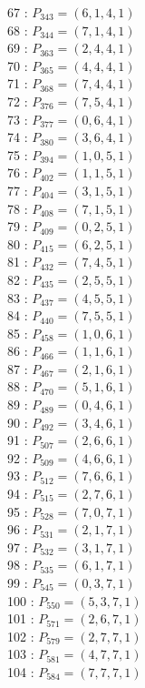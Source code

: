 \documentclass{article}
\begin{document}
{\begin{multicols}{3}
67 : $P_{343}=( 6, 1, 4, 1 )$\\
68 : $P_{344}=( 7, 1, 4, 1 )$\\
69 : $P_{363}=( 2, 4, 4, 1 )$\\
70 : $P_{365}=( 4, 4, 4, 1 )$\\
71 : $P_{368}=( 7, 4, 4, 1 )$\\
72 : $P_{376}=( 7, 5, 4, 1 )$\\
73 : $P_{377}=( 0, 6, 4, 1 )$\\
74 : $P_{380}=( 3, 6, 4, 1 )$\\
75 : $P_{394}=( 1, 0, 5, 1 )$\\
76 : $P_{402}=( 1, 1, 5, 1 )$\\
77 : $P_{404}=( 3, 1, 5, 1 )$\\
78 : $P_{408}=( 7, 1, 5, 1 )$\\
79 : $P_{409}=( 0, 2, 5, 1 )$\\
80 : $P_{415}=( 6, 2, 5, 1 )$\\
81 : $P_{432}=( 7, 4, 5, 1 )$\\
82 : $P_{435}=( 2, 5, 5, 1 )$\\
83 : $P_{437}=( 4, 5, 5, 1 )$\\
84 : $P_{440}=( 7, 5, 5, 1 )$\\
85 : $P_{458}=( 1, 0, 6, 1 )$\\
86 : $P_{466}=( 1, 1, 6, 1 )$\\
87 : $P_{467}=( 2, 1, 6, 1 )$\\
88 : $P_{470}=( 5, 1, 6, 1 )$\\
89 : $P_{489}=( 0, 4, 6, 1 )$\\
90 : $P_{492}=( 3, 4, 6, 1 )$\\
91 : $P_{507}=( 2, 6, 6, 1 )$\\
92 : $P_{509}=( 4, 6, 6, 1 )$\\
93 : $P_{512}=( 7, 6, 6, 1 )$\\
94 : $P_{515}=( 2, 7, 6, 1 )$\\
95 : $P_{528}=( 7, 0, 7, 1 )$\\
96 : $P_{531}=( 2, 1, 7, 1 )$\\
97 : $P_{532}=( 3, 1, 7, 1 )$\\
98 : $P_{535}=( 6, 1, 7, 1 )$\\
99 : $P_{545}=( 0, 3, 7, 1 )$\\
100 : $P_{550}=( 5, 3, 7, 1 )$\\
101 : $P_{571}=( 2, 6, 7, 1 )$\\
102 : $P_{579}=( 2, 7, 7, 1 )$\\
103 : $P_{581}=( 4, 7, 7, 1 )$\\
104 : $P_{584}=( 7, 7, 7, 1 )$\\
\end{multicols}


}
\end{document}
